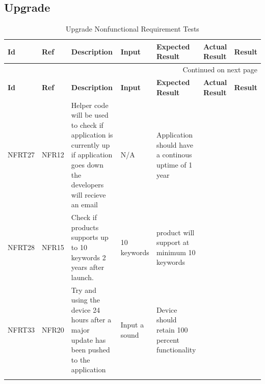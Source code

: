\documentclass[12pt, titlepage]{article}
\begin{document}
\subsection{Upgrade}

\begin{longtable}{|p{1.4cm}|p{1.1cm}|p{2.5cm}|p{1.5cm}|p{2.2cm}|p{1.9cm}|p{1.2cm}|}

  \endfirsthead
  \hline
  \textbf{Id} & \textbf{Ref} & \textbf{Description}                                                         & \textbf{Input}                                    & \textbf{Expected Result}                                    & \textbf{Actual Result} & \textbf{Result}                                    \\ \hline

  \endhead

  \hline \multicolumn{7}{|r|}{Continued on next page} \\ \hline
  \endfoot
   
  \endlastfoot
  \hline
  \textbf{Id} & \textbf{Ref} & \textbf{Description}                                                         & \textbf{Input}                                    & \textbf{Expected Result}    & \textbf{Actual Result}                          & \textbf{Result}                                     \\ \hline
  NFRT27        & NFR12          & Helper code will be used to check if application is currently up if application goes down the developers will recieve an email              & N/A         & Application should have a continous uptime of 1 year         &       & \cellcolor[HTML]{FFFFFF}{\color[HTML]{F8A102} TBD}                        \\ \hline
  NFRT28        & NFR15          & Check if products supports up to 10 keywords 2 years after launch.              & 10 keywords         & product will support at minimum 10 keywords         &       & \cellcolor[HTML]{FFFFFF}{\color[HTML]{F8A102} TBD}                        \\ \hline
  NFRT33        & NFR20          & Try and using the device 24 hours after a major update has been pushed to the application              & Input a sound         & Device should retain 100 percent functionality         &       & \cellcolor[HTML]{FFFFFF}{\color[HTML]{F8A102} TBD}                        \\ \hline
  \caption{Upgrade Nonfunctional Requirement Tests}
  \label{UpgradeNonfunctionalRequirementTests}
\end{longtable}
\end{document}
